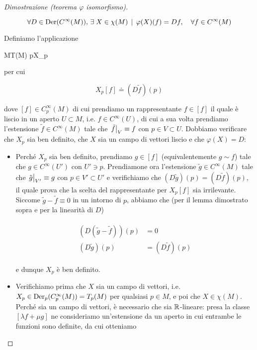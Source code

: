 \begin{proof}[Dimostrazione (teorema $ \varphi $ isomorfismo)]
\begin{itemize}
	\begin{equation}
		\forall D \in \der(C^{\infty}(M)), \, \E X \in \chi(M) \, \mid \, \varphi(X)(f) = D f \qcomma \forall f \in C^{\infty}(M)
	\end{equation}
	
	Definiamo l'applicazione
	
		{M}{T(M)}
		{p}{X_{p}}

	per cui
	
	\begin{equation}
		X_{p} [f] \doteq (D \tilde{f})(p)
	\end{equation}

	dove $ [f] \in C_{p}^{\infty}(M) $ di cui prendiamo un rappresentante $ f \in [f] $ il quale è liscio in un aperto $ U \subset M $, i.e. $ f \in C^{\infty}(U) $, di cui a sua volta prendiamo l'estensione $ \tilde{f} \in C^{\infty}(M) $ tale che $ \eval{\tilde{f}}_{V} \equiv f $ con $ p \in V \subset U $. Dobbiamo verificare che $ X_{p} $ sia ben definito, che $ X $ sia un campo di vettori liscio e che $ \varphi(X) = D $:
	
	\begin{itemize}
		\item Perché $ X_{p} $ sia ben definito, prendiamo $ g \in [f] $ (equivalentemente $ g \sim f $) tale che $ g \in C^{\infty}(U') $ con $ U' \ni p $. Prendiamone ora l'estensione $ \tilde{g} \in C^{\infty}(M) $ tale che $ \eval{\tilde{g}}_{V'} \equiv g $ con $ p \in V' \subset U' $ e verifichiamo che $ (D \tilde{g})(p) = (D \tilde{f})(p) $, il quale prova che la scelta del rappresentante per $ X_{p} [f] $ sia irrilevante. Siccome $ \tilde{g} - \tilde{f} \equiv 0 $ in un intorno di $ p $, abbiamo che (per il lemma dimostrato sopra e per la linearità di $ D $)
		
		\begin{align}
			\begin{split}
				(D (\tilde{g} - \tilde{f}))(p) &= 0 \\
				(D \tilde{g})(p) &= (D \tilde{f})(p)
			\end{split}
		\end{align}
		
		e dunque $ X_{p} $ è ben definito.
		
		\item Verifichiamo prima che $ X $ sia un campo di vettori, i.e. $ X_{p} \in \operatorname{Der}_{p}(C_{p}^{\infty}(M)) = T_{p}(M) $ per qualsiasi $ p \in M $, e poi che $ X \in \chi(M) $. Perché sia un campo di vettori, è necessario che sia $ \mathbb{R} $-lineare: presa la classe $ [\lambda f + \mu g] $ ne consideriamo un'estensione da un aperto in cui entrambe le funzioni sono definite, da cui otteniamo
		

\end{itemize}
\end{itemize}
\end{proof}
